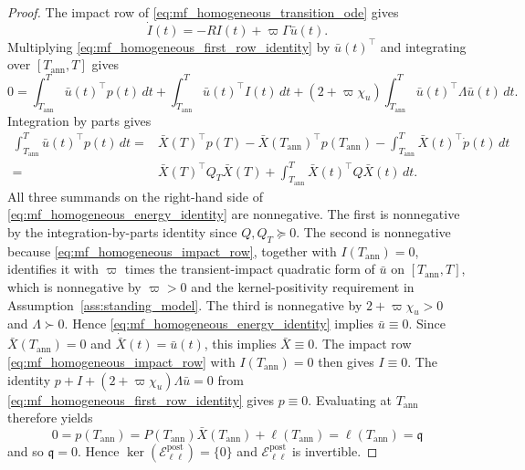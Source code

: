 \documentclass[10pt,a4paper]{amsart}
\begin{document}
\begin{proof}
The impact row of \eqref{eq:mf_homogeneous_transition_ode} gives
\begin{equation}\label{eq:mf_homogeneous_impact_row}
\dot I(t)=-RI(t)+\varpi\Gamma\bar u(t).
\end{equation}
Multiplying \eqref{eq:mf_homogeneous_first_row_identity} by
\(\bar u(t)^\top\) and
integrating over \([T_{\mathrm{ann}},T]\) gives
\begin{equation}\label{eq:mf_homogeneous_energy_identity}
0
=
\int_{T_{\mathrm{ann}}}^T\bar u(t)^\top p(t)\,dt
+
\int_{T_{\mathrm{ann}}}^T\bar u(t)^\top I(t)\,dt
+
(2+\varpi\chi_u)\int_{T_{\mathrm{ann}}}^T
\bar u(t)^\top\Lambda\bar u(t)\,dt.
\end{equation}
Integration by parts gives
\[
\begin{aligned}
\int_{T_{\mathrm{ann}}}^T\bar u(t)^\top p(t)\,dt
={}&\bar X(T)^\top p(T)
-\bar X(T_{\mathrm{ann}})^\top p(T_{\mathrm{ann}})-\int_{T_{\mathrm{ann}}}^T\bar X(t)^\top\dot p(t)\,dt\\
={}&\bar X(T)^\top Q_T\bar X(T)
+\int_{T_{\mathrm{ann}}}^T\bar X(t)^\top Q\bar X(t)\,dt.
\end{aligned}
\]
All three summands on the right-hand side of
\eqref{eq:mf_homogeneous_energy_identity} are nonnegative. The first is
nonnegative by the integration-by-parts identity since
\(Q,Q_T\succeq0\). The second is nonnegative because
\eqref{eq:mf_homogeneous_impact_row}, together with
\(I(T_{\mathrm{ann}})=0\), identifies it with \(\varpi\) times the transient-impact quadratic
form of \(\bar u\) on \([T_{\mathrm{ann}},T]\), which is nonnegative by
\(\varpi>0\) and the
kernel-positivity requirement in Assumption~\ref{ass:standing_model}. The third
is nonnegative by \(2+\varpi\chi_u>0\) and \(\Lambda\succ0\). Hence
\eqref{eq:mf_homogeneous_energy_identity} implies \(\bar u\equiv0\). Since
\(\bar X(T_{\mathrm{ann}})=0\) and
\(\dot{\bar X}(t)=\bar u(t)\), this implies \(\bar X\equiv0\). The impact row
\eqref{eq:mf_homogeneous_impact_row} with \(I(T_{\mathrm{ann}})=0\) then
gives \(I\equiv0\). The identity \(p+I+(2+\varpi\chi_u)\Lambda\bar u=0\) from
\eqref{eq:mf_homogeneous_first_row_identity} gives
\(p\equiv0\). Evaluating at \(T_{\mathrm{ann}}\) therefore yields
\[
0=p(T_{\mathrm{ann}})
=P(T_{\mathrm{ann}})\bar X(T_{\mathrm{ann}})+\ell(T_{\mathrm{ann}})
=\ell(T_{\mathrm{ann}})=\mathfrak q
\]
and so \(\mathfrak q=0\). Hence
\(\ker(\mathcal E^{\mathrm{post}}_{\ell\ell})=\{0\}\) and
\(\mathcal E^{\mathrm{post}}_{\ell\ell}\) is invertible.


\end{proof}
\end{document}
